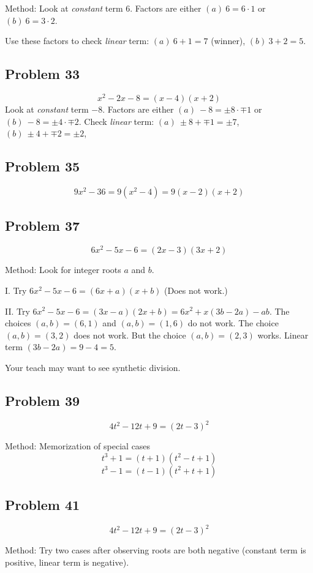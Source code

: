 \documentclass[11pt, oneside]{article}   	%
\begin{document}
Method: Look at \emph{constant} term $6$. Factors are either $(a)\ 6 = 6 \cdot 1$ or $(b)\ 6 = 3 \cdot 2$.

Use these factors to check \emph{linear} term: $(a)\ 6 + 1 = 7$ (winner), $(b)\ 3 + 2 = 5$.

\subsection{Problem 33}
$$x^2-2 x-8=(x-4) (x+2)$$
Look at \emph{constant} term $-8$. Factors are either $(a)\ -8 = \pm8 \cdot \mp1$ or $(b)\ -8 = \pm4 \cdot \mp2$.
Check \emph{linear} term: $(a)\ \pm8 + \mp1 = \pm7 $, $(b)\ \pm4 + \mp2 = \pm2$,

\subsection{Problem 35}
$$9 x^2-36
=9(x^2-4)
=9 (x-2) (x+2)$$

\subsection{Problem 37}
$$6 x^2-5 x-6=(2 x-3) (3 x+2)$$

Method: Look for integer roots $a$ and $b$.

\noindent I. Try $6 x^2-5 x-6 = (6x+a)(x+b)$ (Does not work.)

\noindent II. Try $6 x^2-5 x-6 = (3x-a)(2x+b)=6 x^2 +x(3b-2a)-ab$. The choices $(a,b)=(6,1)$ and $(a,b)=(1,6)$ do not work. The choice $(a,b)=(3,2)$ does not work. But the choice $(a,b)=(2,3)$ works. Linear term $(3b-2a)=9-4=5$.

Your teach may want to see synthetic division.

\subsection{Problem 39}
$$4 t^2-12 t+9 = (2 t-3)^2$$

Method: Memorization of special cases
$$t^3+1=(t+1) \left(t^2-t+1\right)$$
$$t^3-1=(t-1) \left(t^2+t+1\right)$$

\subsection{Problem 41}
$$4 t^2-12 t+9 = (2 t-3)^2$$

Method: Try two cases after observing roots are both negative (constant term is positive, linear term is negative).
\end{document}
